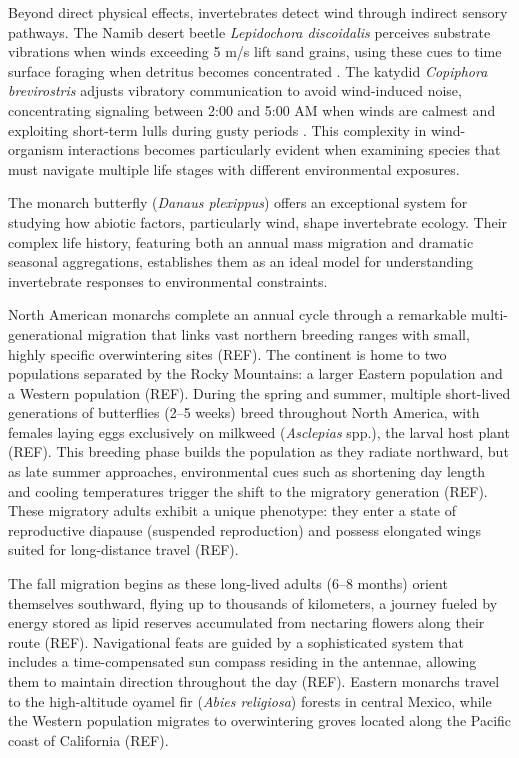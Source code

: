 Beyond direct physical effects, invertebrates detect wind through indirect sensory pathways. The Namib desert beetle \textit{Lepidochora discoidalis} perceives substrate vibrations when winds exceeding 5 m/s lift sand grains, using these cues to time surface foraging when detritus becomes concentrated \citep{seelySandstormsTenebrionidBeetles1997}. The katydid \textit{Copiphora brevirostris} adjusts vibratory communication to avoid wind-induced noise, concentrating signaling between 2:00 and 5:00 AM when winds are calmest and exploiting short-term lulls during gusty periods \citep{rohmerGoneWindSignal2010}. This complexity in wind-organism interactions becomes particularly evident when examining species that must navigate multiple life stages with different environmental exposures.

The monarch butterfly (\textit{Danaus plexippus}) offers an exceptional system for studying how abiotic factors, particularly wind, shape invertebrate ecology. Their complex life history, featuring both an annual mass migration and dramatic seasonal aggregations, establishes them as an ideal model for understanding invertebrate responses to environmental constraints.

North American monarchs complete an annual cycle through a remarkable multi-generational migration that links vast northern breeding ranges with small, highly specific overwintering sites (REF). The continent is home to two populations separated by the Rocky Mountains: a larger Eastern population and a Western population (REF). During the spring and summer, multiple short-lived generations of butterflies (2--5 weeks) breed throughout North America, with females laying eggs exclusively on milkweed (\textit{Asclepias} spp.), the larval host plant (REF). This breeding phase builds the population as they radiate northward, but as late summer approaches, environmental cues such as shortening day length and cooling temperatures trigger the shift to the migratory generation (REF). These migratory adults exhibit a unique phenotype: they enter a state of reproductive diapause (suspended reproduction) and possess elongated wings suited for long-distance travel (REF).

The fall migration begins as these long-lived adults (6--8 months) orient themselves southward, flying up to thousands of kilometers, a journey fueled by energy stored as lipid reserves accumulated from nectaring flowers along their route (REF). Navigational feats are guided by a sophisticated system that includes a time-compensated sun compass residing in the antennae, allowing them to maintain direction throughout the day (REF). Eastern monarchs travel to the high-altitude oyamel fir (\textit{Abies religiosa}) forests in central Mexico, while the Western population migrates to overwintering groves located along the Pacific coast of California (REF).

